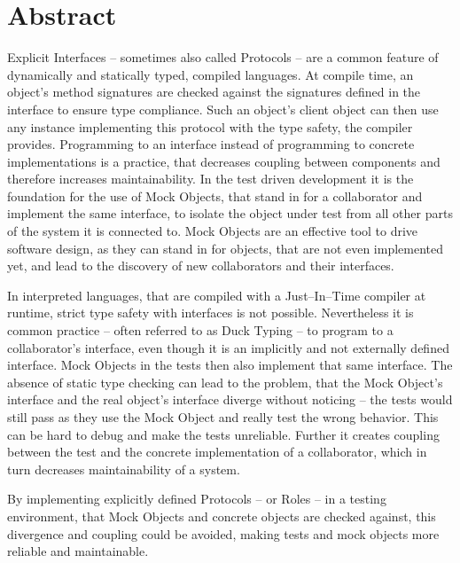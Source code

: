 \begingroup
\let\clearpage\relax
\let\cleardoublepage\relax
\let\cleardoublepage\relax

\chapter*{Abstract}
Explicit Interfaces – sometimes also called Protocols – are a common feature of dynamically and statically typed, compiled languages. At compile time, an object’s method signatures are checked against the signatures defined in the interface to ensure type compliance. Such an object’s client object can then use any instance implementing this protocol with the type safety, the compiler provides. Programming to an interface instead of programming to concrete implementations is a practice, that decreases coupling between components and therefore increases maintainability. In the test driven development it is the foundation for the use of Mock Objects, that stand in for a collaborator and implement the same interface, to isolate the object under test from all other parts of the system it is connected to. Mock Objects are an effective tool to drive software design, as they can stand in for objects, that are not even implemented yet, and lead to the discovery of new collaborators and their interfaces.

In interpreted languages, that are compiled with a Just–In–Time compiler at runtime, strict type safety with interfaces is not possible. Nevertheless it is common practice – often referred to as Duck Typing – to program to a collaborator’s interface, even though it is an implicitly and not externally defined interface. Mock Objects in the tests then also implement that same interface. The absence of static type checking can lead to the problem, that the Mock Object’s interface and the real object’s interface diverge without noticing – the tests would still pass as they use the Mock Object and really test the wrong behavior. This can be hard to debug and make the tests unreliable. Further it creates coupling between the test and the concrete implementation of a collaborator, which in turn decreases maintainability of a system.

By implementing explicitly defined Protocols – or Roles – in a testing environment, that Mock Objects and concrete objects are checked against, this divergence and coupling could be avoided, making tests and mock objects more reliable and maintainable.

\endgroup